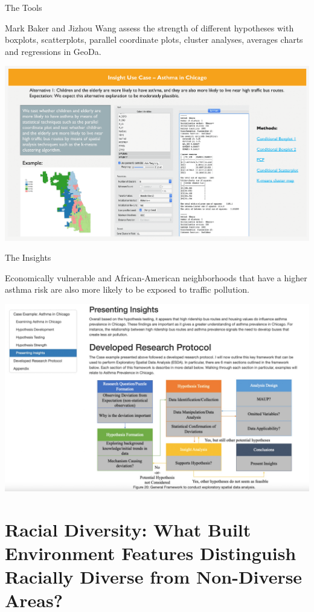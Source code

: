 \documentclass[
]{book}
\begin{document}
The Tools

Mark Baker and Jizhou Wang assess the strength of different hypotheses with boxplots, scatterplots, parallel coordinate plots, cluster analyses, averages charts and regressions in GeoDa.

\includegraphics{images/asthma4.png}

The Insights

Economically vulnerable and African-American neighborhoods that have a higher asthma risk are also more likely to be exposed to traffic pollution.

\includegraphics{images/asthma5.jpg}

\hypertarget{racial-diversity-what-built-environment-features-distinguish-racially-diverse-from-non-diverse-areas}{%
\section{Racial Diversity: What Built Environment Features Distinguish Racially Diverse from Non-Diverse Areas?}\label{racial-diversity-what-built-environment-features-distinguish-racially-diverse-from-non-diverse-areas}}
\end{document}
